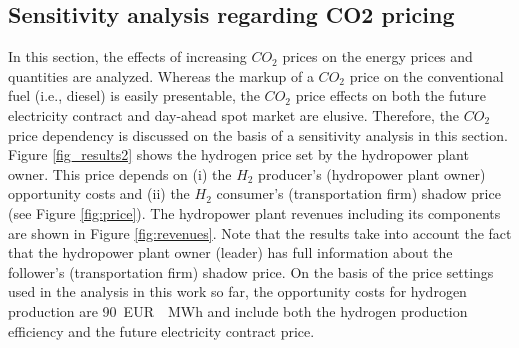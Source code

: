 \documentclass[review]{elsarticle}
\begin{document}
\subsection{Sensitivity analysis regarding CO2 pricing}\label{res:3_CO2}
In this section, the effects of increasing $CO_2$ prices on the energy prices and quantities are analyzed. Whereas the markup of a $CO_2$ price on the conventional fuel (i.e., diesel) is easily presentable, the $CO_2$ price effects on both the future electricity contract and day-ahead spot market are elusive. Therefore, the $CO_2$ price dependency is discussed on the basis of a sensitivity analysis in this section. Figure \ref{fig_results2} shows the hydrogen price set by the hydropower plant owner. This price depends on (i) the $H_2$ producer's (hydropower plant owner) opportunity costs and (ii) the $H_2$ consumer's (transportation firm) shadow price (see Figure \ref{fig:price}). The hydropower plant revenues including its components are shown in Figure \ref{fig:revenues}. Note that the results take into account the fact that the hydropower plant owner (leader) has full information about the follower's (transportation firm) shadow price. On the basis of the price settings used in the analysis in this work so far, the opportunity costs for hydrogen production are \SI{90}{EUR \per MWh} and include both the hydrogen production efficiency and the future electricity contract price. 
\end{document}
